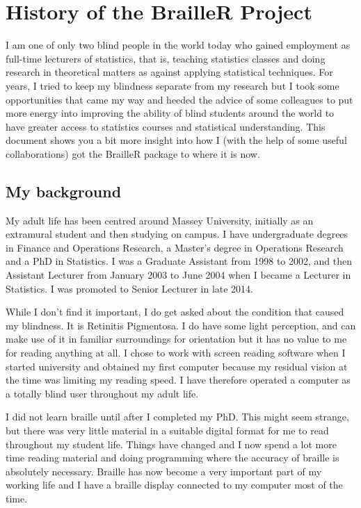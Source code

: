 \documentclass[
]{book}
\begin{document}
\hypertarget{History}{%
\chapter{History of the BrailleR Project}\label{History}}

I am one of only two blind people in the world today who gained employment as full-time lecturers of statistics, that is, teaching statistics classes and doing research in theoretical matters as against applying statistical techniques. For years, I tried to keep my blindness separate from my research but I took some opportunities that came my way and heeded the advice of some colleagues to put more energy into improving the ability of blind students around the world to have greater access to statistics courses and statistical understanding. This document shows you a bit more insight into how I (with the help of some useful collaborations) got the BrailleR package to where it is now.

\hypertarget{my-background}{%
\section{My background}\label{my-background}}

My adult life has been centred around Massey University, initially as an extramural student and then studying on campus. I have undergraduate degrees in Finance and Operations Research, a Master's degree in Operations Research and a PhD in Statistics. I was a Graduate Assistant from 1998 to 2002, and then Assistant Lecturer from January 2003 to June 2004 when I became a Lecturer in Statistics. I was promoted to Senior Lecturer in late 2014.

While I don't find it important, I do get asked about the condition that caused my blindness. It is Retinitis Pigmentosa. I do have some light perception, and can make use of it in familiar surroundings for orientation but it has no value to me for reading anything at all. I chose to work with screen reading software when I started university and obtained my first computer because my residual vision at the time was limiting my reading speed. I have therefore operated a computer as a totally blind user throughout my adult life.

I did not learn braille until after I completed my PhD. This might seem strange, but there was very little material in a suitable digital format for me to read throughout my student life. Things have changed and I now spend a lot more time reading material and doing programming where the accuracy of braille is absolutely necessary. Braille has now become a very important part of my working life and I have a braille display connected to my computer most of the time.
\end{document}

